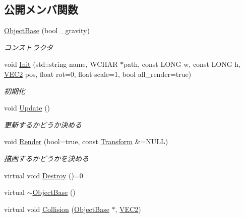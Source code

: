 \subsection*{公開メンバ関数}
\begin{DoxyCompactItemize}
\item 
\mbox{\hyperlink{class_object_base_a8b5bc833070770f6c9e17031b54ef12f}{Object\+Base}} (bool \+\_\+gravity)
\begin{DoxyCompactList}\small\item\em コンストラクタ \end{DoxyCompactList}\item 
void \mbox{\hyperlink{class_object_base_aea82aedc489b0a9d9990aafa06eef514}{Init}} (std\+::string name, W\+C\+H\+AR $\ast$path, const L\+O\+NG w, const L\+O\+NG h, \mbox{\hyperlink{transform_8h_afb0c5e21d4133ff4f200992c0b534e1b}{V\+E\+C2}} pos, float rot=0, float scale=1, bool all\+\_\+render=true)
\begin{DoxyCompactList}\small\item\em 初期化 \end{DoxyCompactList}\item 
void \mbox{\hyperlink{class_object_base_a5b5672034139b22235ada326eb16dd3e}{Update}} ()
\begin{DoxyCompactList}\small\item\em 更新するかどうか決める \end{DoxyCompactList}\item 
void \mbox{\hyperlink{class_object_base_ac84be5b56d23b8809ca08e27c0dcb16a}{Render}} (bool=true, const \mbox{\hyperlink{class_transform}{Transform}} \&=N\+U\+LL)
\begin{DoxyCompactList}\small\item\em 描画するかどうかを決める \end{DoxyCompactList}\item 
virtual void \mbox{\hyperlink{class_object_base_a7fa4c548153c3af20f89673ffea809af}{Destroy}} ()=0
\item 
virtual \mbox{\hyperlink{class_object_base_a7074bc9389069351c2d0eee6a47e5ee3}{$\sim$\+Object\+Base}} ()
\item 
virtual void \mbox{\hyperlink{class_object_base_ad772d7a42f5e46c39481f5db22ee8193}{Collision}} (\mbox{\hyperlink{class_object_base}{Object\+Base}} $\ast$, \mbox{\hyperlink{transform_8h_afb0c5e21d4133ff4f200992c0b534e1b}{V\+E\+C2}})
\end{DoxyCompactItemize}
